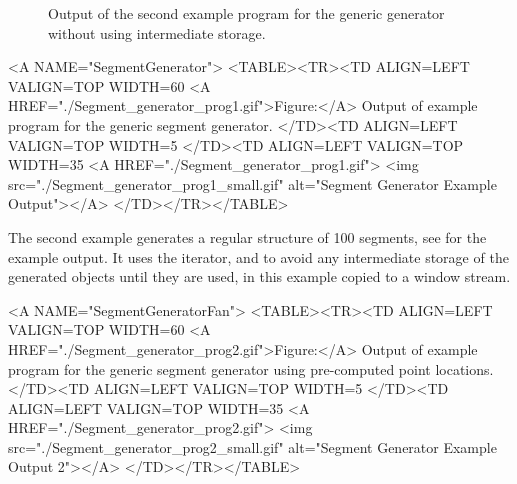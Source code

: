 \begin{ccTexOnly}
\begin{figure}
\begin{minipage}[t]{0.45\textwidth}
      \caption{Output of the second example program for the generic
        generator without using intermediate storage.}
      \label{figureSegmentGeneratorFan}
    \end{minipage}%
  \end{figure}
\end{ccTexOnly}


\begin{ccHtmlOnly}
  <A NAME="SegmentGenerator">
  <TABLE><TR><TD ALIGN=LEFT VALIGN=TOP WIDTH=60%
    <A HREF="./Segment_generator_prog1.gif">Figure:</A>
    Output of example program for the generic segment generator.
  </TD><TD ALIGN=LEFT VALIGN=TOP WIDTH=5%
  </TD><TD ALIGN=LEFT VALIGN=TOP WIDTH=35%
    <A HREF="./Segment_generator_prog1.gif">
        <img src="./Segment_generator_prog1_small.gif" 
             alt="Segment Generator Example Output"></A>
  </TD></TR></TABLE>
\end{ccHtmlOnly}

The second example generates a regular structure of 100 segments, see 
 for the example
output. It uses the  iterator,
 and  to
avoid any intermediate storage of the generated objects until they are
used, in this example copied to a window stream.


\begin{ccHtmlOnly}
  <A NAME="SegmentGeneratorFan">
  <TABLE><TR><TD ALIGN=LEFT VALIGN=TOP WIDTH=60%
    <A HREF="./Segment_generator_prog2.gif">Figure:</A>
    Output of example program for the generic segment generator using
    pre-computed point locations.
  </TD><TD ALIGN=LEFT VALIGN=TOP WIDTH=5%
  </TD><TD ALIGN=LEFT VALIGN=TOP WIDTH=35%
    <A HREF="./Segment_generator_prog2.gif">
        <img src="./Segment_generator_prog2_small.gif" 
             alt="Segment Generator Example Output 2"></A>
  </TD></TR></TABLE>
\end{ccHtmlOnly}


\ccParDims
\cgalColumnLayout
\beforecprogskip\parskip
{}




\ccParDims
\beforecprogskip\parskip
{}


